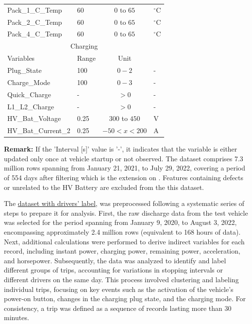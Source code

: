 \begin{table}[!ht]
\begin{center}
\begin{tabular}{llcl}
    Pack\_1\_C\_Temp & 60 & $0$ to $65$ & $^\circ$C \\ 
    Pack\_2\_C\_Temp & 60 & $0$ to $65$ & $^\circ$C \\ 
    Pack\_4\_C\_Temp & 60 & $0$ to $65$ & $^\circ$C \\ 
    \midrule
    \multicolumn{4}{c}{Charging} \\ 
    Variables & Range & Unit \\ 
    \midrule
    Plug\_State & 100 & $0-2$ & - \\ 
    Charge\_Mode & 100 & $0-3$ & - \\ 
    Quick\_Charge & - & $>0$ & - \\ 
    L1\_L2\_Charge & - & $>0$ & - \\ 
    HV\_Bat\_Voltage & 0.25 & $300$ to $450$ & V \\ 
    HV\_Bat\_Current\_2 & 0.25 & $-50 < x <200$ & A \\ 
    \bottomrule
    \end{tabular}
    \end{center}
    \footnotesize{
        \textbf{Remark:} If the 'Interval [s]' value is '-', it indicates that the variable is either updated only once at vehicle startup or not observed.
        The dataset comprises 7.3 million rows spanning from January 21, 2021, to July 29, 2022, covering a period of 554 days after filtering which is the extension on \cite{CCNC_2023}.
        Features containing defects or unrelated to the HV Battery are excluded from the this dataset.
    }

\end{table}

The \href{https://drive.google.com/drive/folders/1kWsFL2bpmckD-Muj2zxcFtk2Ac_ZPdUg?usp=sharing}{dataset with drivers' label}, was preprocessed following a systematic series of steps to prepare it for analysis. 
First, the raw discharge data from the test vehicle was selected for the period spanning from January 9, 2020, to August 3, 2022, encompassing approximately 2.4 million rows (equivalent to 168 hours of data). 
Next, additional calculations were performed to derive indirect variables for each record, including instant power, charging power, remaining power, acceleration, and horsepower. 
Subsequently, the data was analyzed to identify and label different groups of trips, accounting for variations in stopping intervals or different drivers on the same day. 
This process involved clustering and labeling individual trips, focusing on key events such as the activation of the vehicle's power-on button, changes in the charging plug state, and the charging mode. For consistency, a trip was defined as a sequence of records lasting more than 30 minutes.

